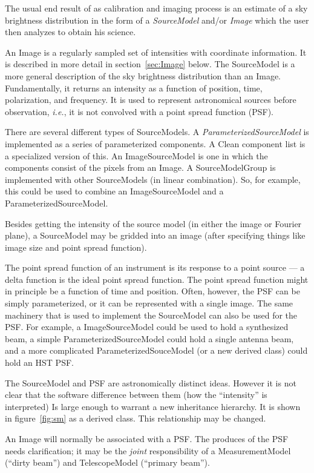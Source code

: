 The usual end result of as calibration and imaging process is an
estimate of a sky brightness distribution in the form of a {\em
SourceModel} and/or {\em Image} which the user then analyzes to obtain
his science.

An Image is a regularly sampled set of intensities with coordinate
information. It is described in more detail in section~\ref{sec:Image}
below. The SourceModel is a more general description of the sky
brightness distribution than an Image. Fundamentally, it returns an
intensity as a function of position, time, polarization, and
frequency. It is used to represent astronomical sources before
observation, {\em i.e.}, it is not convolved with a point spread
function (PSF).

There are several different types of SourceModels. A {\em
ParameterizedSourceModel} is implemented as a series of parameterized
components. A Clean component list is a specialized version of
this. An ImageSourceModel is one in which the components consist of
the pixels from an Image.  A SourceModelGroup is implemented with
other SourceModels (in linear combination). So, for example, this
could be used to combine an ImageSourceModel and a
ParameterizedSourceModel.

Besides getting the intensity of the source model (in either the image
or Fourier plane), a SourceModel may be gridded into an image (after
specifying things like image size and point spread function).

The point spread function of an instrument is its response to a point
source --- a delta function is the ideal point spread function.  The
point spread function might in principle be a function of time and
position. Often, however, the PSF can be simply parameterized, or it
can be represented with a single image. The same machinery that is
used to implement the SourceModel can also be used for the PSF. For
example, a ImageSourceModel could be used to hold a synthesized beam,
a simple ParameterizedSourceModel could hold a single antenna beam,
and a more complicated ParameterizedSouceModel (or a new derived
class) could hold an HST PSF.

The SourceModel and PSF are astronomically distinct ideas. However it
is not clear that the software difference between them (how the
``intensity'' is interpreted) Is large enough to warrant a new
inheritance hierarchy. It is shown in figure~\ref{fig:sm} as a derived
class. This relationship may be changed.

An Image will normally be associated with a PSF. The produces of the PSF
needs clarification; it may be the {\em joint} responsibility of a
MeasurementModel (``dirty beam'') and TelescopeModel (``primary beam'').


